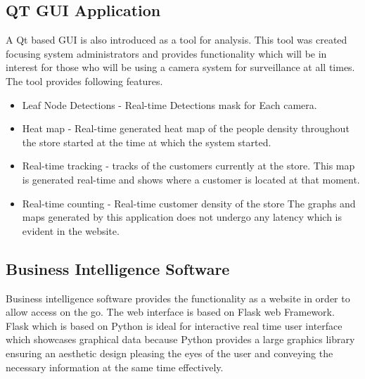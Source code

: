 \documentclass[12pt,a4paper]{report}
\begin{document}
\subsection{QT GUI Application}
A Qt based GUI is also introduced as a tool for analysis. This tool was created focusing system administrators and provides functionality which will be in interest for those who will be using a camera system for surveillance at all times. The tool provides following features.
\begin{itemize}
\item Leaf Node Detections - Real-time Detections mask for Each camera.
\item Heat map - Real-time generated heat map of the people density throughout the store started at the time at which the system started.
\item Real-time tracking - tracks of the customers currently at the store. This map is generated real-time and shows where a customer is located at that moment.
\item Real-time counting - Real-time customer density of the store
The graphs and maps generated by this application does not undergo any latency which is evident in the website.
\end{itemize}
\subsection{Business Intelligence Software}

Business intelligence software provides the functionality as a website in order to allow access on the go. The web interface is based on Flask web Framework. Flask which is based on Python is ideal for interactive real time user interface which showcases graphical data because Python provides a large graphics library ensuring an aesthetic design pleasing the eyes of the user and conveying the necessary information at the same time effectively.
\end{document}
